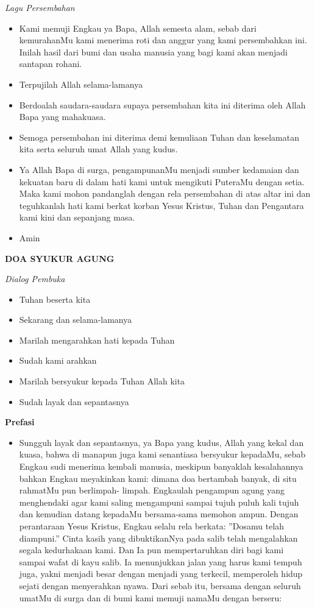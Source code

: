 \documentclass[a5paper,headsepline,titlepage,12pt,nnormalheadings,DIVcalc,twoside]{scrbook}
\makeatletter
\newcommand{\subjudul}[1]{%
  {\parindent \z@ 
    \interlinepenalty\@M \bfseries #1\par\nobreak \vskip 10\p@ }}
\newcommand{\lagu}[1]{%
  {\parindent \z@ 
    \interlinepenalty\@M \slshape \mdseries \Large \textit{#1}\par\nobreak \vskip 10\p@ }}
\newcommand{\keterangan}[1]{%
  {\parindent \z@  \slshape 
    \interlinepenalty\@M \textsl{#1}\par\nobreak  \vskip 5\p@}}
\newcommand{\BU}[1]{\begin{itemize} \item[U:] #1 \end{itemize}}
\newcommand{\BI}[1]{\begin{itemize} \item[I:] #1 \end{itemize}}
\makeatother
\begin{document}
\lagu{Lagu Persembahan}


\BI{Kami memuji Engkau ya Bapa, Allah semesta alam, sebab 
dari kemurahanMu kami menerima roti dan anggur yang 
kami persembahkan ini. Inilah hasil dari bumi dan usaha 
manusia yang bagi kami akan menjadi santapan rohani.}

\BU{Terpujilah Allah selama-lamanya}

\BI{Berdoalah saudara-saudara supaya persembahan kita ini 
diterima oleh Allah Bapa yang mahakuasa.}

\BU{Semoga persembahan ini diterima demi kemuliaan Tuhan 
dan keselamatan kita serta seluruh umat Allah yang kudus.}

\BI{Ya Allah Bapa di surga, pengampunanMu menjadi sumber 
kedamaian dan kekuatan baru di dalam hati kami untuk 
mengikuti PuteraMu dengan setia. Maka kami mohon 
pandanglah dengan rela persembahan di atas altar ini dan 
teguhkanlah hati kami berkat korban Yesus Kristus, Tuhan 
dan Pengantara kami kini dan sepanjang masa.}

\BU{Amin} 

\subjudul{DOA SYUKUR AGUNG}

\keterangan{Dialog Pembuka}

\BI{Tuhan beserta kita}

\BU{Sekarang dan selama-lamanya}

\BI{Marilah mengarahkan hati kepada Tuhan}

\BU{Sudah kami arahkan}

\BI{Marilah bersyukur kepada Tuhan Allah kita}

\BU{Sudah layak dan sepantasnya}

 

\subjudul{Prefasi}

\BI{Sungguh layak dan sepantasnya, ya Bapa yang kudus, 
Allah yang kekal dan kuasa, bahwa di manapun juga kami 
senantiasa bersyukur kepadaMu, sebab Engkau sudi 
menerima kembali manusia, meskipun banyaklah 
kesalahannya bahkan Engkau meyakinkan kami: dimana 
doa bertambah banyak, di situ rahmatMu pun berlimpah-
limpah. Engkaulah pengampun agung yang menghendaki 
agar kami saling mengampuni sampai tujuh puluh kali 
tujuh dan kemudian datang kepadaMu bersama-sama 
memohon ampun. Dengan perantaraan Yesus Kristus, 
Engkau selalu rela berkata: ”Dosamu telah diampuni.” 
Cinta kasih yang dibuktikanNya pada salib telah 
mengalahkan segala kedurhakaan kami. Dan Ia pun 
mempertaruhkan diri bagi kami sampai wafat di kayu 
salib. Ia menunjukkan jalan yang harus kami tempuh juga, 
yakni menjadi besar dengan menjadi yang terkecil, 
memperoleh hidup sejati dengan menyerahkan nyawa. 
Dari sebab itu, bersama dengan seluruh umatMu di surga 
dan di bumi kami memuji namaMu dengan berseru:}
\end{document}
